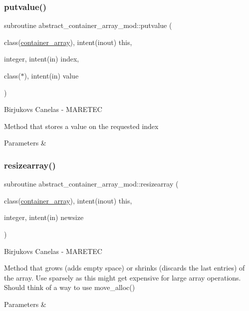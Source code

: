 \subsubsection{\texorpdfstring{putvalue()}{putvalue()}}
{\footnotesize\ttfamily subroutine abstract\+\_\+container\+\_\+array\+\_\+mod\+::putvalue (\begin{DoxyParamCaption}\item[{class(\hyperlink{structabstract__container__array__mod_1_1container__array}{container\+\_\+array}), intent(inout)}]{this,  }\item[{integer, intent(in)}]{index,  }\item[{class($\ast$), intent(in)}]{value }\end{DoxyParamCaption})\hspace{0.3cm}{\ttfamily [private]}}



Birjukovs Canelas -\/ M\+A\+R\+E\+T\+EC 

Method that stores a value on the requested index 
\begin{DoxyParams}{Parameters}
{\em } & \\
\hline
\end{DoxyParams}
\mbox{\label{namespaceabstract__container__array__mod_ac2d73eb111ffde938f81e3f93b0cb3e0}} 
\subsubsection{\texorpdfstring{resizearray()}{resizearray()}}
{\footnotesize\ttfamily subroutine abstract\+\_\+container\+\_\+array\+\_\+mod\+::resizearray (\begin{DoxyParamCaption}\item[{class(\hyperlink{structabstract__container__array__mod_1_1container__array}{container\+\_\+array}), intent(inout)}]{this,  }\item[{integer, intent(in)}]{newsize }\end{DoxyParamCaption})\hspace{0.3cm}{\ttfamily [private]}}



Birjukovs Canelas -\/ M\+A\+R\+E\+T\+EC 

Method that grows (adds empty space) or shrinks (discards the last entries) of the array. Use sparsely as this might get expensive for large array operations. Should think of a way to use move\+\_\+alloc() 
\begin{DoxyParams}{Parameters}
{\em } & \\
\hline
\end{DoxyParams}
